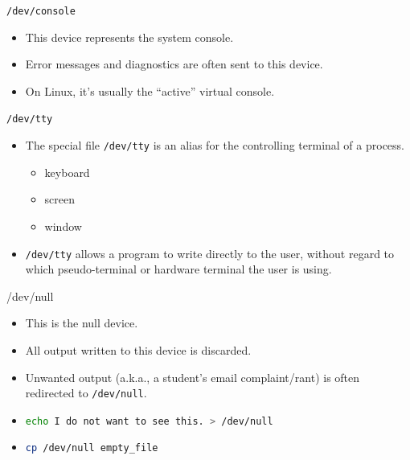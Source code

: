 \documentclass[14pt,aspectratio=1610]{beamer}
\begin{document}
\begin{frame}{\texttt{/dev/console}}
\begin{itemize}
  \item This device represents the system console.
  \item Error messages and diagnostics are often sent to this device.
  \item On Linux, it's usually the ``active'' virtual console.
\end{itemize}
\end{frame}

\begin{frame}{\texttt{/dev/tty}}
\begin{itemize}
  \item The special file \texttt{/dev/tty} is an alias for the controlling terminal of a process.
  \begin{itemize}
    \item keyboard
    \item screen
    \item window
  \end{itemize}
  \item \texttt{/dev/tty} allows a program to write directly to the user, without regard to which pseudo-terminal or hardware terminal the user is using.
\end{itemize}
\end{frame}

\begin{frame}{/dev/null}
\begin{itemize}
\item This is the null device.
\item All output written to this device is discarded.
\item Unwanted output (a.k.a., a student's email complaint/rant) is often redirected to \texttt{/dev/null}.
\item \lstinline[language=bash, deletekeywords=do]{echo I do not want to see this. > /dev/null}
\item \lstinline[language=bash, morekeywords=cp]{cp /dev/null empty_file}
\end{itemize}
\end{frame}

\end{document}
